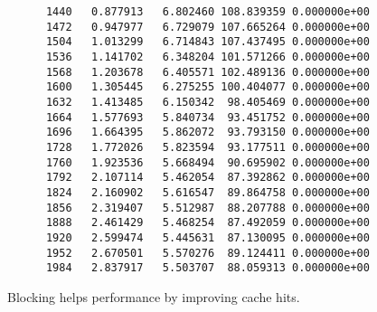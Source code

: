 \documentclass{article}
\begin{document}
\begin{enumerate}
\begin{verbatim}
      1440   0.877913   6.802460 108.839359 0.000000e+00
      1472   0.947977   6.729079 107.665264 0.000000e+00
      1504   1.013299   6.714843 107.437495 0.000000e+00
      1536   1.141702   6.348204 101.571266 0.000000e+00
      1568   1.203678   6.405571 102.489136 0.000000e+00
      1600   1.305445   6.275255 100.404077 0.000000e+00
      1632   1.413485   6.150342  98.405469 0.000000e+00
      1664   1.577693   5.840734  93.451752 0.000000e+00
      1696   1.664395   5.862072  93.793150 0.000000e+00
      1728   1.772026   5.823594  93.177511 0.000000e+00
      1760   1.923536   5.668494  90.695902 0.000000e+00
      1792   2.107114   5.462054  87.392862 0.000000e+00
      1824   2.160902   5.616547  89.864758 0.000000e+00
      1856   2.319407   5.512987  88.207788 0.000000e+00
      1888   2.461429   5.468254  87.492059 0.000000e+00
      1920   2.599474   5.445631  87.130095 0.000000e+00
      1952   2.670501   5.570276  89.124411 0.000000e+00
      1984   2.837917   5.503707  88.059313 0.000000e+00
    \end{verbatim}

    Blocking helps performance by improving cache hits.  


\end{enumerate}
\end{document}
